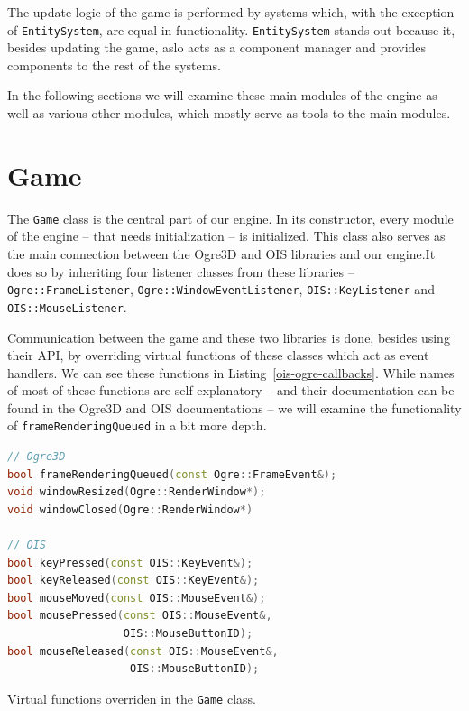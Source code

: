 The update logic of the game is performed by systems which, with the exception of \texttt{EntitySystem}, are equal in functionality.
\texttt{EntitySystem} stands out because it, besides updating the game, aslo acts as a component manager and provides components
to the rest of the systems.

In the following sections we will examine these main modules of the engine as well as various other modules, which mostly serve as tools
to the main modules.

\section{Game}

The \texttt{Game} class is the central part of our engine. In its constructor, every module of the engine -- that needs initialization --
is initialized. This class also serves as the main connection between the Ogre3D and OIS libraries and our engine.It does so by inheriting
four listener classes from these libraries -- \texttt{Ogre::FrameListener}, \texttt{Ogre::WindowEventListener}, \texttt{OIS::KeyListener}
and \texttt{OIS::MouseListener}.

Communication between the game and these two libraries is done, besides using their API, by overriding virtual functions of these classes
which act as event handlers. We can see these functions in Listing~\ref{ois-ogre-callbacks}. While names of most of these functions are
self-explanatory -- and their documentation can be found in the Ogre3D and OIS documentations -- we will examine the functionality of
\texttt{frameRenderingQueued} in a bit more depth.

\begin{listing}[H]
    \centering
    \begin{lstlisting}[language=C++]
// Ogre3D
bool frameRenderingQueued(const Ogre::FrameEvent&);
void windowResized(Ogre::RenderWindow*);
void windowClosed(Ogre::RenderWindow*)

// OIS
bool keyPressed(const OIS::KeyEvent&);
bool keyReleased(const OIS::KeyEvent&);
bool mouseMoved(const OIS::MouseEvent&);
bool mousePressed(const OIS::MouseEvent&,
                  OIS::MouseButtonID);
bool mouseReleased(const OIS::MouseEvent&,
                   OIS::MouseButtonID);
    \end{lstlisting}
    \caption{Virtual functions overriden in the \texttt{Game} class.}
    \label{ois-ogre-callbacks}
\end{listing}

